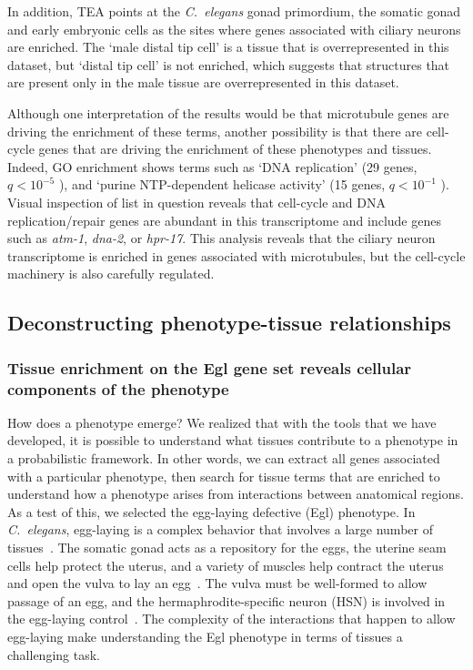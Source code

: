 \documentclass[10pt,letterpaper,twocolumn]{article}
\newcommand{\cel}{\emph{C.~elegans}}
\newcommand{\qval}[1]{
                      \ensuremath{
                                  q<10^{-#1}
                                  }
                      }
\begin{document}
In addition, TEA points at the \cel{} gonad primordium, the somatic gonad
and early embryonic cells as the sites where genes associated with ciliary neurons
are enriched. The `male distal tip cell' is a tissue
that is overrepresented in this dataset, but `distal tip cell' is not enriched,
which suggests that structures that are present only in the male tissue are
overrepresented in this dataset.

Although one interpretation of the results would be that microtubule genes
are driving the enrichment of these terms, another possibility is that
there are cell-cycle genes that are driving the enrichment of these phenotypes
and tissues. Indeed, GO enrichment shows terms such as `DNA replication' (29
genes, \qval{5}), and `purine NTP-dependent helicase activity'
(15 genes, \qval{1}). Visual inspection of list in question reveals that
cell-cycle and DNA replication/repair genes are abundant in this transcriptome
and include genes such as \emph{atm-1}, \emph{dna-2}, or \emph{hpr-17}. This
analysis reveals that the ciliary neuron transcriptome is enriched in
genes associated with microtubules, but the cell-cycle machinery is also
carefully regulated.

\subsection*{Deconstructing phenotype-tissue relationships}
\subsubsection*{Tissue enrichment on the Egl gene set reveals cellular
components of the phenotype}
How does a phenotype emerge? We realized that with the tools that we have
developed, it is possible to understand what tissues contribute to a phenotype
in a probabilistic framework. In other words, we can extract all genes associated
with a particular phenotype, then search for tissue terms that are enriched to
understand how a phenotype arises from interactions between anatomical regions.
As a test of this, we selected the egg-laying defective (Egl) phenotype.
In \cel{}, egg-laying is a complex behavior that involves
a large number of tissues~\cite{}. The somatic gonad acts as a repository for the eggs,
the uterine seam cells help protect the uterus, and a variety of muscles help
contract the uterus and open the vulva to lay an egg~\cite{}. The vulva must be well-formed
to allow passage of an egg, and the hermaphrodite-specific neuron (HSN) is involved
in the egg-laying control~\cite{}. The complexity of the interactions that
happen to allow egg-laying make understanding the Egl phenotype in terms of
tissues a challenging task.
\end{document}
